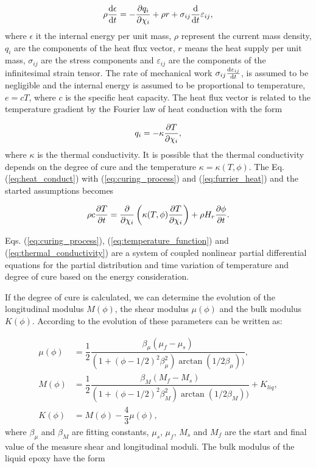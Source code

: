 \begin{equation} \label{eq:heat_conduct}
	\rho \dv{\epsilon}{t} = - \pdv{q_i}{\chi_i} + \rho r + \sigma_{ij} \dv{t}\varepsilon_{ij},
\end{equation}
where $\epsilon$ it the internal energy per unit mass, $\rho$ represent the current mass density, $q_i$ are the components of the heat flux vector, $r$ means the heat supply per unit mass, $\sigma_{ij}$ are the stress components and $\varepsilon_{ij}$ are the components of the infinitesimal strain tensor. 
The rate of mechanical work $\sigma_{ij}\dv{\varepsilon_{ij}}{t} $, is assumed to be negligible and the internal energy is assumed to be proportional to temperature, $e=cT$, where $c$ is the specific heat capacity. The heat flux vector is related to the temperature gradient by the Fourier law of heat conduction with the form

\begin{equation}\label{eq:furrier_heat}
	q_i = - \kappa \pdv{T}{\chi_i},
\end{equation}
where $\kappa$ is the thermal conductivity. It is possible that the thermal conductivity depends on the degree of cure and the temperature $\kappa = \kappa(T, \phi)$. The Eq. (\ref{eq:heat_conduct}) with (\ref{eq:curing_process}) and (\ref{eq:furrier_heat}) and the started assumptions becomes

\begin{equation}\label{eq:thermal_conductivity}
	\rho c \pdv{T}{t} = \pdv{\chi_i} \left( \kappa(T, \phi)  \pdv{T}{\chi_i} \right) + \rho H_r \pdv{\phi}{t}.
\end{equation}
 
 Eqs. (\ref{eq:curing_process}), (\ref{eq:temperature_function}) and (\ref{eq:thermal_conductivity}) are a system of coupled nonlinear partial differential equations for the partial distribution and time variation of temperature and degree of cure based on the energy consideration. 
 
 If the degree of cure is calculated, we can determine the evolution of the longitudinal modulus $M(\phi)$, the shear modulus $\mu(\phi)$ and the bulk modulus $K(\phi)$. According to \cite{heinrich2012generation} the evolution of these parameters can be written as:
 
 \begin{align}
 	\mu(\phi) &= \dfrac{1}{2} \dfrac{\beta_\mu ( \mu_f - \mu_s)}{\left(1+(\phi-1/2)^2 \beta_\mu^2\right) \arctan(1/2\beta_\mu))}, \\
 	M(\phi) &= \dfrac{1}{2} \dfrac{\beta_M ( M_f - M_s)}{\left(1+(\phi-1/2)^2 \beta_M^2\right) \arctan(1/2\beta_M))} + K_{liq}, \\
 	K(\phi) &= M(\phi) - \dfrac{4}{3}\mu(\phi),
 \end{align}
 where $\beta_\mu$ and $\beta_M$ are fitting constants, $\mu_s$, $\mu_f$, $M_s$ and $M_f$ are the start and final value of the measure shear and longitudinal moduli. The bulk modulus of the liquid epoxy have the form
 
